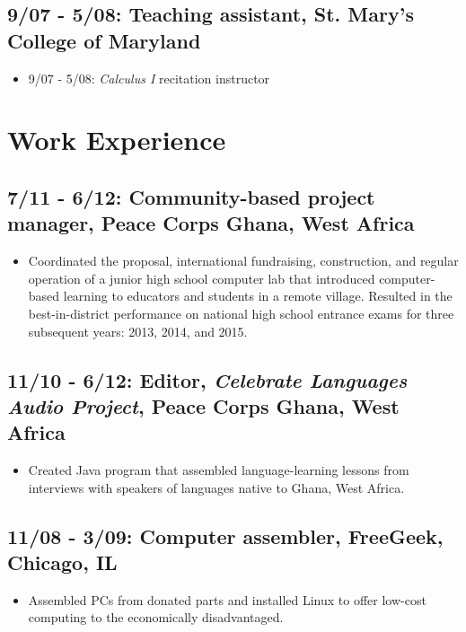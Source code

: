 \documentclass[11pt]{cv}
\begin{document}
\subsection*{9/07 - 5/08: Teaching assistant, St. Mary's College of Maryland}
\label{sec:orgheadline15}
\begin{itemize}
\item 9/07 - 5/08: \emph{Calculus I} recitation instructor\\
\end{itemize}
\section*{Work Experience}
\label{sec:orgheadline20}
\subsection*{7/11 - 6/12: Community-based project manager, Peace Corps Ghana, West Africa}
\label{sec:orgheadline17}
\begin{itemize}
\item Coordinated the proposal, international fundraising, construction, and regular operation of a junior high school computer lab that introduced computer-based learning to educators and students in a remote village. Resulted in the best-in-district performance on national high school entrance exams for three subsequent years: 2013, 2014, and 2015.\\
\end{itemize}
\subsection*{11/10 - 6/12: Editor, \emph{Celebrate Languages Audio Project}, Peace Corps Ghana, West Africa}
\label{sec:orgheadline18}
\begin{itemize}
\item Created Java program that assembled language-learning lessons from interviews with speakers of languages native to Ghana, West Africa.\\
\end{itemize}
\subsection*{11/08 - 3/09: Computer assembler, FreeGeek, Chicago, IL}
\label{sec:orgheadline19}
\begin{itemize}
\item Assembled PCs from donated parts and installed Linux to offer low-cost computing to the economically disadvantaged.\\
\end{itemize}
\end{document}

